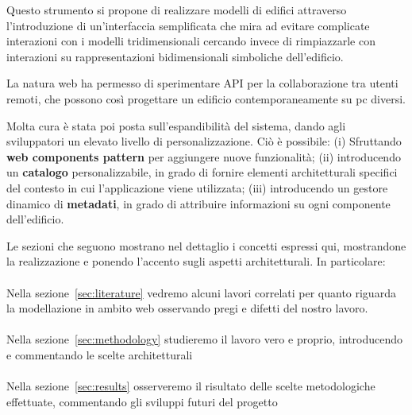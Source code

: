 Questo strumento si propone di realizzare modelli di edifici attraverso l'introduzione di un'interfaccia semplificata che mira ad evitare complicate interazioni con i modelli tridimensionali cercando invece di rimpiazzarle con interazioni su rappresentazioni bidimensionali simboliche dell'edificio.

La natura web ha permesso di sperimentare API per la collaborazione tra utenti remoti, che possono cos\`i progettare un edificio contemporaneamente su pc diversi.

Molta cura \`e stata poi posta sull'espandibilit\`a del sistema, dando agli sviluppatori un elevato livello di personalizzazione. Ci\`o \`e possibile: (i) Sfruttando \textbf{web components pattern} per aggiungere nuove funzionalità; (ii) introducendo un \textbf{catalogo} personalizzabile, in grado di fornire elementi architetturali specifici del contesto in cui l'applicazione viene utilizzata; (iii) introducendo un gestore dinamico di \textbf{metadati}, in grado di 
attribuire informazioni su ogni componente dell'edificio.

Le sezioni che seguono mostrano nel dettaglio i concetti espressi qui, mostrandone la realizzazione e ponendo l'accento sugli aspetti architetturali. In particolare:\\\\
Nella sezione~\ref{sec:literature} vedremo alcuni lavori correlati per quanto riguarda la modellazione in ambito web osservando pregi e difetti del nostro lavoro.\\\\
Nella sezione~\ref{sec:methodology} studieremo il lavoro vero e proprio, introducendo e commentando le scelte architetturali\\\\
Nella sezione~\ref{sec:results} osserveremo il risultato delle scelte metodologiche effettuate, commentando gli sviluppi futuri del progetto\\\\

\fi